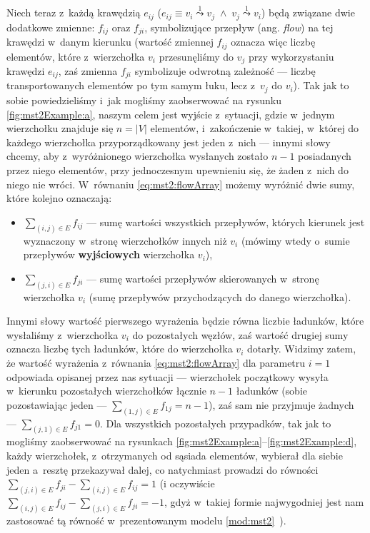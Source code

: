 Niech teraz z~każdą krawędzią $e_{ij}$ ($e_{ij} \equiv v_{i} \overset{1}{\leadsto} v_{j} \; \wedge \; v_{j} \overset{1}{\leadsto} v_{i}$) będą związane dwie dodatkowe zmienne: $f_{ij}$ oraz $f_{ji}$, symbolizujące przepływ (ang. \textit{flow}) na tej krawędzi w~danym kierunku (wartość zmiennej $f_{ij}$ oznacza więc liczbę elementów, które z~wierzchołka $v_{i}$ przesunęliśmy do $v_{j}$ przy wykorzystaniu krawędzi $e_{ij}$, zaś zmienna $f_{ji}$ symbolizuje odwrotną zależność --- liczbę transportowanych elementów po tym samym łuku, lecz z~$v_{j}$ do $v_{i}$).
Tak jak to sobie powiedzieliśmy i~jak mogliśmy zaobserwować na rysunku \ref{fig:mst2Example:a}, naszym celem jest wyjście z~sytuacji, gdzie w~jednym wierzchołku znajduje się $n = \left| V \right|$ elementów, i~zakończenie w~takiej, w~której do każdego wierzchołka przyporządkowany jest jeden z~nich --- innymi słowy chcemy, aby z~wyróżnionego wierzchołka wysłanych zostało $n - 1$ posiadanych przez niego elementów, przy jednoczesnym upewnieniu się, że żaden z~nich do niego nie wróci.
W~równaniu \ref{eq:mst2:flowArray} możemy wyróżnić dwie sumy, które kolejno oznaczają:

\begin{itemize}
	\item $\sum_{ \left( i, j \right ) \in E } f_{ij}$ --- sumę wartości wszystkich przepływów, których kierunek jest wyznaczony w~stronę wierzchołków innych niż $v_{i}$ (mówimy wtedy o~sumie przepływów \textbf{wyjściowych} wierzchołka $v_{i}$),
	\item $\sum_{ \left( j, i \right ) \in E } f_{ji}$ --- sumę wartości przepływów skierowanych w~stronę wierzchołka $v_{i}$ (sumę przepływów przychodzących do danego wierzchołka).
\end{itemize}

Innymi słowy wartość pierwszego wyrażenia będzie równa liczbie ładunków, które wysłaliśmy z~wierzchołka $v_{i}$ do pozostałych węzłów, zaś wartość drugiej sumy oznacza liczbę tych ładunków, które do wierzchołka $v_{i}$ dotarły.
Widzimy zatem, że wartość wyrażenia z~równania \ref{eq:mst2:flowArray} dla parametru $i = 1$ odpowiada opisanej przez nas sytuacji --- wierzchołek początkowy wysyła w~kierunku pozostałych wierzchołków łącznie $n - 1$ ładunków (sobie pozostawiając jeden --- $\sum_{ \left( 1, j \right ) \in E } f_{1j} = n - 1$), zaś sam nie przyjmuje żadnych --- $\sum_{ \left( j, 1 \right ) \in E } f_{j1} = 0$.
Dla wszystkich pozostałych przypadków, tak jak to mogliśmy zaobserwować na rysunkach \ref{fig:mst2Example:a}--\ref{fig:mst2Example:d}, każdy wierzchołek, z~otrzymanych od sąsiada elementów, wybierał dla siebie jeden a~resztę przekazywał dalej, co natychmiast prowadzi do równości $\sum_{ \left( j, i \right ) \in E } f_{ji} - \sum_{ \left( i, j \right ) \in E } f_{ij} = 1$ (i oczywiście $\sum_{ \left( i, j \right ) \in E } f_{ij} - \sum_{ \left( j, i \right ) \in E } f_{ji} = -1$, gdyż w~takiej formie najwygodniej jest nam zastosować tą równość w~prezentowanym modelu \ref{mod:mst2}~\cite[$35$]{robustSTP}).


